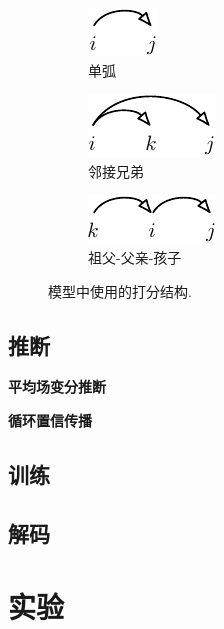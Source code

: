 \begin{figure}[tb]
    \centering
    \begin{subfigure}[b]{0.32\textwidth}
        \centering
        \includegraphics[scale=1.5]{figures/scoring-part/arc.pdf}
        \caption{单弧}
        \label{fig:scoring-part-arc}
    \end{subfigure}
    \begin{subfigure}[b]{0.32\textwidth}
        \centering
        \includegraphics[scale=1.5]{figures/scoring-part/sib.pdf}
        \caption{邻接兄弟}
        \label{fig:scoring-part-sib}
    \end{subfigure}
    \begin{subfigure}[b]{0.32\textwidth}
        \centering
        \includegraphics[scale=1.5]{figures/scoring-part/grd.pdf}
        \caption{祖父-父亲-孩子}
        \label{fig:scoring-part-grd}
    \end{subfigure}
    \caption{模型中使用的打分结构.}
    \label{fig:dep-vi-scoring-part}
\end{figure}

\subsection{推断}

\noindent\textbf{平均场变分推断}

\noindent\textbf{循环置信传播}

\subsection{训练}

\subsection{解码}

\section{实验}\label{sec:dep-vi-exp}

